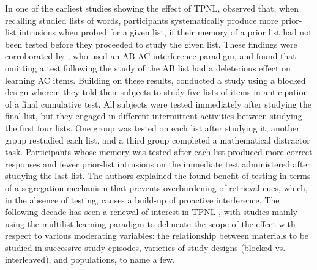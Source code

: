 \documentclass[../main.tex]{subfiles}
\begin{document}
In one of the earliest studies showing the effect of TPNL, 
\cite{darleyEffectsPriorFree1971} observed that, when recalling studied lists 
of words, participants systematically produce more prior-list intrusions when 
probed for a given list, if their memory of a prior list had not been tested 
before they proceeded to study the given list. These findings were corroborated 
by \cite{tulvingNegativeTransferEffects1974}, who used an AB-AC interference 
paradigm, and found that omitting a test following the study of the AB list had 
a deleterious effect on learning AC items. Building on these results, 
\cite{szpunarTestingStudyInsulates2008} conducted a study using a blocked 
design wherein they told their subjects to study five lists of items in 
anticipation of a final cumulative test. All subjects were tested immediately 
after studying the final list, but they engaged in different intermittent 
activities between studying the first four lists. One group was tested on each 
list after studying it, another group restudied each list, and a third group 
completed a mathematical distractor task. Participants whose memory was tested 
after each list produced more correct responses and fewer prior-list intrusions 
on the immediate test administered after studying the last list. The authors 
explained the found benefit of testing in terms of a segregation mechanism that 
prevents overburdening of retrieval cues, which, in the absence of testing, 
causes a build-up of proactive interference. The following decade has seen a 
renewal of interest in TPNL \citep{chanRetrievalPotentiatesNew2018, 
pastotterRetrievalPracticeEnhances2014, yangEnhancingLearningRetrieval2018}, 
with studies mainly using the multilist learning paradigm to delineate the 
scope of the effect with respect to various moderating variables: the 
relationship between materials to be studied in successive study episodes, 
varieties of study designs (blocked vs. interleaved), and populations, to name 
a few.
\end{document}
